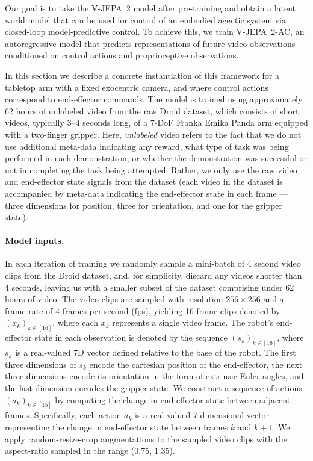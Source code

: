 \documentclass[]{fairmeta}
\newcommand{\model}{V-JEPA~2\xspace}
\newcommand{\acModel}{V-JEPA~2-AC\xspace}
\begin{document}
Our goal is to take the \model model after pre-training and obtain a latent world model that can be used for control of an embodied agentic system via closed-loop model-predictive control. To achieve this, we train \acModel, an autoregressive model that predicts representations of future video observations conditioned on control actions and proprioceptive observations.

In this section we describe a concrete instantiation of this framework for a tabletop arm with a fixed exocentric camera, and where control actions correspond to end-effector commands.
The model is trained using approximately 62 hours of unlabeled video from the raw Droid dataset, which consists of short videos, typically 3--4 seconds long, of a 7-DoF Franka Emika Panda arm equipped with a two-finger gripper. Here, \emph{unlabeled} video refers to the fact that we do not use additional meta-data indicating any reward, what type of task was being performed in each demonstration, or whether the demonstration was successful or not in completing the task being attempted. Rather, we only use the raw video and end-effector state signals from the dataset (each video in the dataset is accompanied by meta-data indicating the end-effector state in each frame --- three dimensions for position, three for orientation, and one for the gripper state).

\paragraph{\bf Model inputs.}
In each iteration of training we randomly sample a mini-batch of 4 second video clips from the Droid dataset, and, for simplicity, discard any videos shorter than 4 seconds, leaving us with a smaller subset of the dataset comprising under 62 hours of video.
The video clips are sampled with resolution $256\times256$ and a frame-rate of 4 frames-per-second (fps), yielding 16 frame clips denoted by $(x_k)_{k\in[16]}$, where each $x_k$ represents a single video frame.
The robot's end-effector state in each observation is denoted by the sequence $(s_k)_{k\in[16]}$, where $s_k$ is a real-valued 7D vector defined relative to the base of the robot.
The first three dimensions of $s_k$ encode the cartesian position of the end-effector, the next three dimensions encode its orientation in the form of extrinsic Euler angles, and the last dimension encodes the gripper state.
We construct a sequence of actions $(a_k)_{k\in[15]}$ by computing the change in end-effector state between adjacent frames.
Specifically, each action $a_k$ is a real-valued 7-dimensional vector representing the change in end-effector state between frames $k$ and $k+1$.
We apply random-resize-crop augmentations to the sampled video clips with the aspect-ratio sampled in the range (0.75, 1.35).
\end{document}
